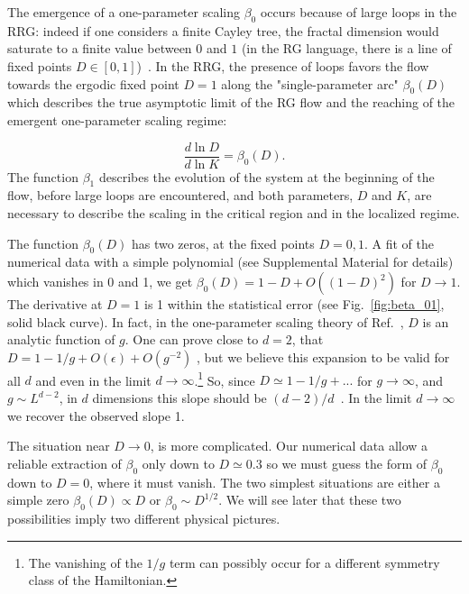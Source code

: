 \documentclass[reprint,aps,prl,superscriptaddress,english,nolongbibliography]{revtex4-1}
\begin{document}
The emergence of a one-parameter scaling $\beta_{0}$ occurs because of large loops in the RRG: indeed if one considers a finite Cayley tree, the fractal dimension would saturate to a finite value between $0$ and $1$ (in the RG language, there is a line of fixed points $D\in[0,1]$)~\cite{tikhonov2016fractality}. In the RRG, the presence of loops favors the flow towards the ergodic fixed point $D=1$ along the "single-parameter arc" $\beta_{0}(D)$ which
 describes the true asymptotic limit of the RG flow and the reaching of the emergent one-parameter scaling regime:

\begin{equation} 
    \frac{d\ln D}{d\ln K}=\beta_0(D).
    \label{eq:one-param}
\end{equation}
The function $\beta_1$ describes the evolution of the system at the beginning of the flow, before large loops are encountered, and both parameters, $D$ and $K$, are necessary to describe the scaling in the critical region and in the localized regime.  
 
The function $\beta_0(D)$ has two zeros, at the fixed points $D=0,1$. A fit of the numerical data with a simple polynomial (see Supplemental Material for details) which vanishes in 0 and 1, we get $\beta_0(D)= 1-D+O((1-D)^2)$ for $D\to 1$. The derivative at $D=1$ is 1 within the statistical error (see Fig.~\ref{fig:beta_01}, solid black curve). In fact, in the one-parameter scaling theory of Ref.~\cite{abrahams1979scaling}, $D$ is an analytic function of $g$. One can prove close to $d=2$, that $D=1-1/g+O(\epsilon)+O(g^{-2})$ \cite{altshuler2024renormalization}, but we believe this expansion to be valid for all $d$ and even in the limit $d\to\infty$.\footnote{The vanishing of the $1/g$ term can possibly occur for a different symmetry class of the Hamiltonian.} So, since $D\simeq 1-1/g+...$ for $g\to\infty$, and $g\sim L^{d-2}$, in $d$ dimensions this slope should be $(d-2)/d$~\cite{altshuler2024renormalization}. In the limit $d\to\infty$ we recover the observed slope 1. 

The situation near $D\to 0$, is more complicated. Our numerical data allow a reliable extraction of $\beta_0$ only down to $D\simeq 0.3$ so we must guess the form of $\beta_0$ down to $D=0$, where it must vanish. The two simplest situations are either a simple zero $\beta_0(D)\propto D$ or $\beta_0\sim D^{1/2}$. We will see later that these two possibilities imply two different physical pictures.
\end{document}
